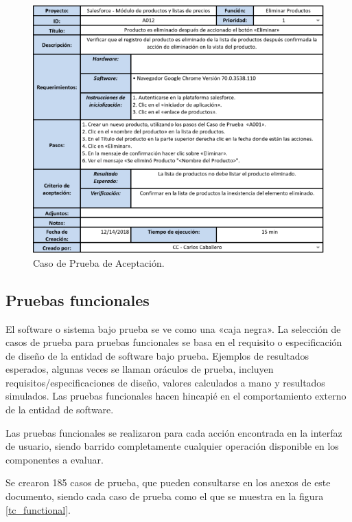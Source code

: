 \begin{figure}
\centering
\includegraphics[width=1.0\textwidth]{graphics/tc1-acceptance.eps}
\caption{Caso de Prueba de Aceptación.}
\label{tc_acceptance}
\end{figure}

\subsection{Pruebas funcionales}
El software o sistema bajo prueba se ve como una «caja negra». La selección de
casos de prueba para pruebas funcionales se basa en el requisito o
especificación de diseño de la entidad de software bajo prueba. Ejemplos de
resultados esperados, algunas veces se llaman oráculos de prueba, incluyen
requisitos/especificaciones de diseño, valores calculados a mano y resultados
simulados. Las pruebas funcionales hacen hincapié en el comportamiento externo
de la entidad de software\cite{Luo}.

Las pruebas funcionales se realizaron para cada acción encontrada en la interfaz
de usuario, siendo barrido completamente cualquier operación disponible en los
componentes a evaluar.

Se crearon 185 casos de prueba, que pueden consultarse en los anexos de este
documento, siendo cada caso de prueba como el que se muestra en la figura
\ref{tc_functional}.

